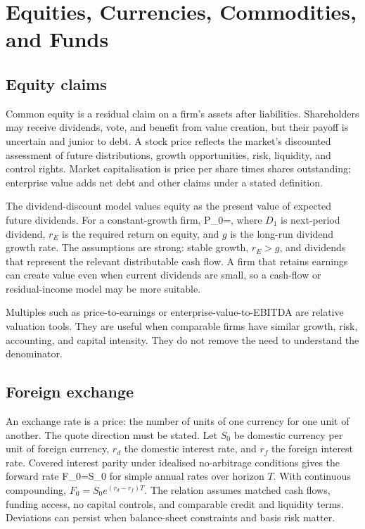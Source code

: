 \chapter{Equities, Currencies, Commodities, and Funds}

\section{Equity claims}
Common equity is a residual claim on a firm's assets after liabilities. Shareholders may receive dividends, vote, and benefit from value creation, but their payoff is uncertain and junior to debt. A stock price reflects the market's discounted assessment of future distributions, growth opportunities, risk, liquidity, and control rights. Market capitalisation is price per share times shares outstanding; enterprise value adds net debt and other claims under a stated definition.

The dividend-discount model values equity as the present value of expected future dividends. For a constant-growth firm,
  P_0=,
\closeformula
where $D_1$ is next-period dividend, $r_E$ is the required return on equity, and $g$ is the long-run dividend growth rate. The assumptions are strong: stable growth, $r_E>g$, and dividends that represent the relevant distributable cash flow. A firm that retains earnings can create value even when current dividends are small, so a cash-flow or residual-income model may be more suitable.

Multiples such as price-to-earnings or enterprise-value-to-EBITDA are relative valuation tools. They are useful when comparable firms have similar growth, risk, accounting, and capital intensity. They do not remove the need to understand the denominator.

\section{Foreign exchange}
An exchange rate is a price: the number of units of one currency for one unit of another. The quote direction must be stated. Let $S_0$ be domestic currency per unit of foreign currency, $r_d$ the domestic interest rate, and $r_f$ the foreign interest rate. Covered interest parity under idealised no-arbitrage conditions gives the forward rate
  F_0=S_0
\closeformula
for simple annual rates over horizon $T$. With continuous compounding, $F_0=S_0e^{(r_d-r_f)T}$. The relation assumes matched cash flows, funding access, no capital controls, and comparable credit and liquidity terms. Deviations can persist when balance-sheet constraints and basis risk matter.


